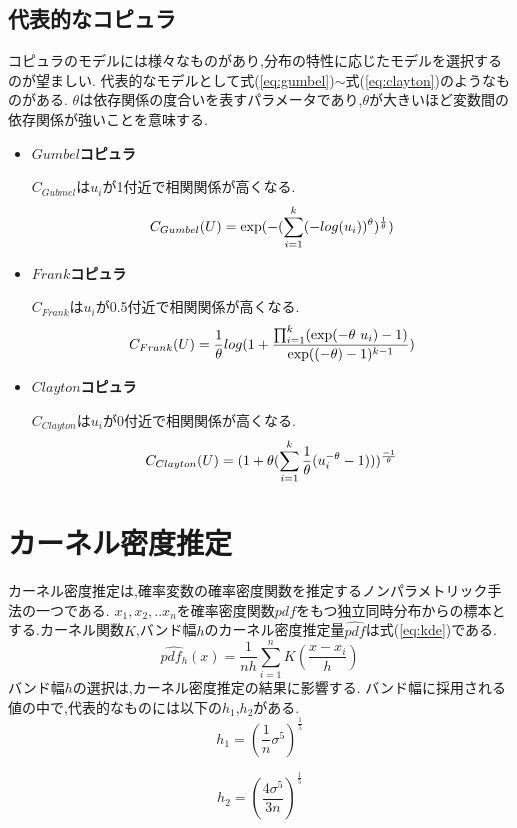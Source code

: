 \subsection{代表的なコピュラ}
コピュラのモデルには様々なものがあり,分布の特性に応じたモデルを選択するのが望ましい.
代表的なモデルとして式(\ref{eq:gumbel})$\sim$式(\ref{eq:clayton})のようなものがある.
$\theta$は依存関係の度合いを表すパラメータであり,$\theta$が大きいほど変数間の依存関係が強いことを意味する.
\begin{itemize}
 \item {\bf $Gumbel$コピュラ}
   \par
$C_{Gubmel}$は$u_i$が1付近で相関関係が高くなる.
    \begin{equation}
    \label{eq:gumbel}
     \centering
    C_{Gumbel}(U) = \exp(-(\sum_{i=1}^{k}(-log(u_i))^{\theta})^{\frac{1}{\theta}})
\end{equation}
\item {\bf $Frank$コピュラ}
\par$C_{Frank}$は$u_i$が0.5付近で相関関係が高くなる.
\begin{equation}
    \label{eq:frank}
    \centering
    C_{Frank}(U) = \frac{1}{\theta}log(1 + \frac{\prod_{i=1}^{k}(\exp(-\theta\ u_i) - 1)}{\exp((-\theta)-1)^{k-1}})
\end{equation}

 \item {\bf $Clayton$コピュラ}
\par$C_{Clayton}$は$u_i$が0付近で相関関係が高くなる.
\begin{equation}
    \label{eq:clayton}
    \centering
    C_{Clayton}(U) = (1 + \theta(\sum_{i=1}^{k}\frac{1}{\theta}(u_i^{-\theta} - 1)))^{\frac{-1}{\theta}}
\end{equation}
\end{itemize}

\section{カーネル密度推定}
カーネル密度推定\cite{Silverman}は,確率変数の確率密度関数を推定するノンパラメトリック手法の一つである.
$x_1,x_2,..x_n$を確率密度関数$pdf$をもつ独立同時分布からの標本とする.カーネル関数$K$,バンド幅$h$のカーネル密度推定量$\hat{pdf}$は式(\ref{eq:kde})である.
\begin{equation}
\label{eq:kde}
\hat{pdf_{h}}(x)=\frac{1}{nh}\sum_{i=1}^n K(\frac{x-x_i}{h})
\end{equation}
\label{sbsc:related_bw}
バンド幅$h$の選択は,カーネル密度推定の結果に影響する.
バンド幅に採用される値の中で,代表的なものには以下の$h_{1}$,$h_{2}$がある.\cite{Scott}\cite{Silverman}
\begin{equation*}
\label{eq:scott}
h_{1}=\left(\frac{1}{n}{\sigma}^5\right)^{\frac{1}{5}}
\end{equation*}

\begin{equation*}
\label{eq:silverman}
h_{2}=\left(\frac{4{\sigma}^5}{3n}\right)^\frac{1}{5}
\end{equation*}
